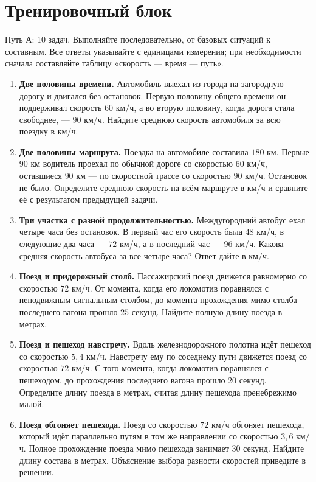 \documentclass[a4paper,12pt]{article}
\newcommand{\sectiontitle}[1]{\section*{\color{darkaccent}#1}\vspace{-2mm}}
\newcommand{\smallnote}[1]{{\small\color{muted}#1}}
\begin{document}
\sectiontitle{Тренировочный блок}
\smallnote{Путь А: 10 задач. Выполняйте последовательно, от базовых ситуаций к составным. Все ответы указывайте с единицами измерения; при необходимости сначала составляйте таблицу «скорость --- время --- путь».}
\vspace{3mm}
\begin{enumerate}[label=\textcolor{darkaccent}{\textbf{\arabic*.}},leftmargin=9mm,itemsep=11pt]
\item \textbf{Две половины времени.} Автомобиль выехал из города на загородную дорогу и двигался без остановок. Первую половину общего времени он поддерживал скорость $60$ км/ч, а во вторую половину, когда дорога стала свободнее, --- $90$ км/ч. Найдите среднюю скорость автомобиля за всю поездку в км/ч.

\item \textbf{Две половины маршрута.} Поездка на автомобиле составила $180$ км. Первые $90$ км водитель проехал по обычной дороге со скоростью $60$ км/ч, оставшиеся $90$ км --- по скоростной трассе со скоростью $90$ км/ч. Остановок не было. Определите среднюю скорость на всём маршруте в км/ч и сравните её с результатом предыдущей задачи.

\item \textbf{Три участка с разной продолжительностью.} Междугородний автобус ехал четыре часа без остановок. В первый час его скорость была $48$ км/ч, в следующие два часа --- $72$ км/ч, а в последний час --- $96$ км/ч. Какова средняя скорость автобуса за все четыре часа? Ответ дайте в км/ч.

\item \textbf{Поезд и придорожный столб.} Пассажирский поезд движется равномерно со скоростью $72$ км/ч. От момента, когда его локомотив поравнялся с неподвижным сигнальным столбом, до момента прохождения мимо столба последнего вагона прошло $25$ секунд. Найдите полную длину поезда в метрах.

\item \textbf{Поезд и пешеход навстречу.} Вдоль железнодорожного полотна идёт пешеход со скоростью $5{,}4$ км/ч. Навстречу ему по соседнему пути движется поезд со скоростью $72$ км/ч. С того момента, когда локомотив поравнялся с пешеходом, до прохождения последнего вагона прошло $20$ секунд. Определите длину поезда в метрах, считая длину пешехода пренебрежимо малой.

\pagebreak
\item \textbf{Поезд обгоняет пешехода.} Поезд со скоростью $72$ км/ч обгоняет пешехода, который идёт параллельно путям в том же направлении со скоростью $3{,}6$ км/ч. Полное прохождение поезда мимо пешехода занимает $30$ секунд. Найдите длину состава в метрах. Объяснение выбора разности скоростей приведите в решении.


\end{enumerate}
\end{document}

